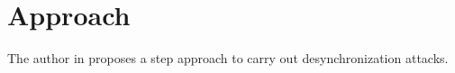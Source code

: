 \chapter{Approach}
The author in \cite{b6} proposes a step approach to carry out desynchronization attacks. 